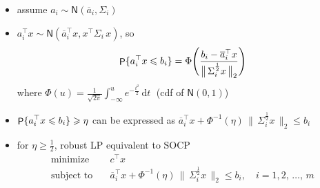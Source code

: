 \documentclass[11pt]{extarticle}
\newcommand{\ds}{\displaystyle}
\DeclareMathOperator\prb{{\sf P}}
\theoremstyle{definition}
\begin{document}
\begin{itemize}
  \item assume $\ds a_i\sim\mathsf{N}(\overline{a}_i, \Sigma_i)$
  \item $\ds a_i^\top x\sim\mathsf{N}(\overline{a}_i^\top x, x^\top\Sigma_i\,x)$, so
    \begin{align*}
      \prb\{a_i^\top x\leqslant b_i\} = \Phi\Bigg(\frac{b_i - \overline{a}_i^\top x}{\big\|\,\Sigma_i^\frac{1}{2} x\,\big\|_2}\Bigg)
    \end{align*}
    where $\ds\Phi(u) = \frac{1}{\sqrt{2\pi}}\int_{-\infty}^u e^{-\frac{t^2}{2}}\,\text{d}t\;$ (cdf of $\mathsf{N}(0, 1)$)
  \item $\ds\prb\{a_i^\top x\leqslant b_i\}\geqslant\eta$ can be expressed as $\overline{a}_i^\top x + \Phi^{-1}(\eta)\,\big\|\,\Sigma_i^\frac{1}{2} x\,\big\|_2\leqslant b_i$
  \item for $\ds\eta\geqslant\frac{1}{2}$, robust LP equivalent to SOCP
    \begin{align*}
      \text{minimize}\quad & c^\top x \\
      \text{subject to}\quad & \overline{a}_i^\top x + \Phi^{-1}(\eta)\,\big\|\,\Sigma_i^\frac{1}{2} x\,\big\|_2\leqslant b_i, \quad i = 1, 2,\,\ldots,\,m 
    \end{align*}
\end{itemize}

\newpage
\end{document}
